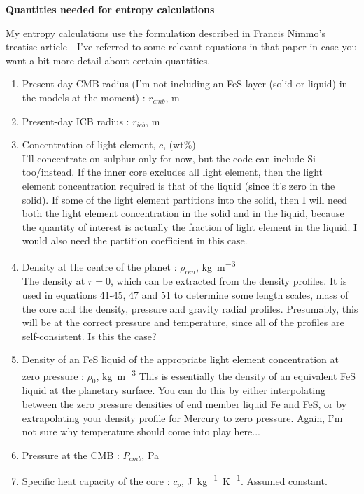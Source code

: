 \documentclass[a4paper,12pt]{article}
\begin{document}
\frenchspacing
\begin{center}
{\large{\bf Quantities needed for entropy calculations}} 
\end{center}
\vspace{-0.5cm}

My entropy calculations use the formulation described in Francis Nimmo's treatise article - I've referred to some relevant equations in that paper in case you want a bit more detail about certain quantities. \begin{enumerate}
\item{Present-day CMB radius (I'm not including an FeS layer (solid or liquid) in the models at the moment) : $r_{cmb}$},  \si{m}
\item{Present-day ICB radius : $r_{icb}$}, \si{m}
\item{Concentration of light element, $c$, (wt\%) \\I'll concentrate on sulphur only for now, but the code can include Si too/instead.
If the inner core excludes all light element, then the light element concentration required is that of the liquid (since it's zero in the solid). If some of the light element partitions into the solid, then I will need both the light element concentration in the solid and in the liquid, because the quantity of interest is actually the fraction of light element in the liquid. I would also need the partition coefficient in this case.}
\item{Density at the centre of the planet : $\rho_{cen}$, \si{kg. m^{-3}}\\
The density at $r=0$, which can be extracted from the density profiles. It is used in equations 41-45, 47 and 51 to determine some length scales, mass of the core and the density, pressure and gravity radial profiles. Presumably, this will be at the correct pressure and temperature, since all of the profiles are self-consistent. Is this the case?}
\item{Density of an FeS liquid of the appropriate light element concentration at zero pressure : $\rho_0$, \si{kg.m^{-3}}
This is essentially the density of an equivalent FeS liquid at the planetary surface. You can do this by either interpolating between the zero pressure densities of end member liquid Fe and FeS, or by extrapolating your density profile for Mercury to zero pressure. Again, I'm not sure why temperature should come into play here...} 
\item{Pressure at the CMB : $P_{cmb}$, \si{\pascal}\\}
\item{Specific heat capacity of the core : $c_p$, \si{\joule. kg^{-1} \kelvin^{-1}}. Assumed constant.}

\end{enumerate}
\end{document}
